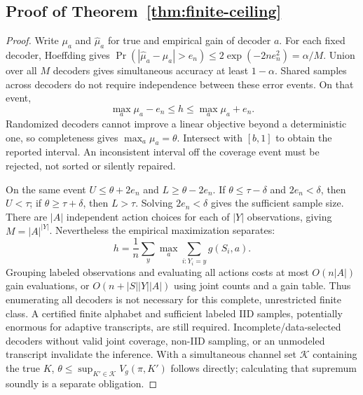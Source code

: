 \subsection{Proof of Theorem~\ref{thm:finite-ceiling}}
\begin{proof}
Write $\mu_a$ and $\widehat\mu_a$ for true and empirical gain of decoder $a$.
For each fixed decoder, Hoeffding gives
$\Pr(|\widehat\mu_a-\mu_a|>e_n)\le2\exp(-2ne_n^2)=\alpha/M$.
Union over all $M$ decoders gives simultaneous accuracy at least $1-\alpha$.
Shared samples across decoders do not require independence between these
error events. On that event,
\[
 \max_a\mu_a-e_n\le h\le\max_a\mu_a+e_n.
\]
Randomized decoders cannot improve a linear objective beyond a deterministic
one, so completeness gives $\max_a\mu_a=\theta$.
Intersect with $[b,1]$ to obtain the reported interval.
An inconsistent interval off the coverage event must be rejected, not sorted
or silently repaired.

On the same event $U\le\theta+2e_n$ and $L\ge\theta-2e_n$.
If $\theta\le\tau-\delta$ and $2e_n<\delta$, then $U<\tau$; if
$\theta\ge\tau+\delta$, then $L>\tau$.
Solving $2e_n<\delta$ gives the sufficient sample size.
There are $|A|$ independent action choices for each of $|Y|$ observations,
giving $M=|A|^{|Y|}$. Nevertheless the empirical maximization separates:
\[
 h=\frac1n\sum_y\max_a\sum_{i:Y_i=y}g(S_i,a).
\]
Grouping labeled observations and evaluating all actions costs at most
$O(n|A|)$ gain evaluations, or $O(n+|S||Y||A|)$ using joint counts and a
gain table. Thus enumerating all decoders is not necessary for this complete,
unrestricted finite class. A certified finite alphabet and sufficient labeled
IID samples, potentially enormous for adaptive transcripts, are still required.
Incomplete/data-selected decoders without valid joint
coverage, non-IID sampling, or an unmodeled transcript invalidate the inference.
With a simultaneous channel set $\mathcal K$ containing the true $K$,
$\theta\le\sup_{K'\in\mathcal K}V_g(\pi,K')$ follows directly; calculating
that supremum soundly is a separate obligation.
\end{proof}

